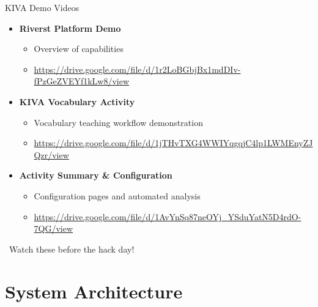 \documentclass[aspectratio=169]{beamer}
\begin{document}
\begin{frame}{KIVA Demo Videos}
\begin{itemize}
    \item \textbf{Riverst Platform Demo}
    \begin{itemize}
        \item Overview of capabilities
        \item \url{https://drive.google.com/file/d/1r2LoBGbjBx1mdDIv-fPzGeZVEYf1kLw8/view}
    \end{itemize}
    
    \vspace{0.3cm}
    
    \item \textbf{KIVA Vocabulary Activity}
    \begin{itemize}
        \item Vocabulary teaching workflow demonstration
        \item \url{https://drive.google.com/file/d/1jTHvTXG4WWIYqgqjC4lp1LWMEnyZJQzr/view}
    \end{itemize}
    
    \vspace{0.3cm}
    
    \item \textbf{Activity Summary \& Configuration}
    \begin{itemize}
        \item Configuration pages and automated analysis
        \item \url{https://drive.google.com/file/d/1AvYnSq87neOYj_YSduYatN5D4rdO-7QG/view}
    \end{itemize}
\end{itemize}

\vspace{0.3cm}
\begin{center}
\textcolor{kivablue}{\faInfoCircle\ Watch these before the hack day!}
\end{center}
\end{frame}

\section{System Architecture}
\end{document}
